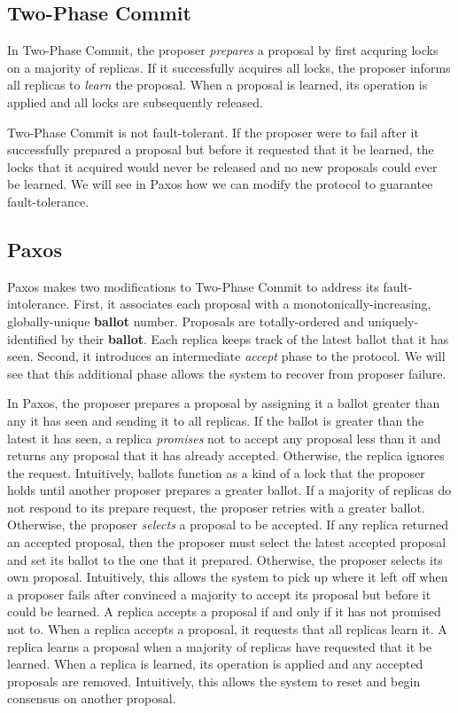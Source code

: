 \documentclass[../main.tex]{subfiles}
\begin{document}
  \subsection{Two-Phase Commit}
  In Two-Phase Commit, the proposer \emph{prepares} a proposal by first acquring locks on a majority
  of replicas. If it successfully acquires all locks, the proposer informs all replicas to
  \emph{learn} the proposal. When a proposal is learned, its operation is applied and all locks are
  subsequently released.

  Two-Phase Commit is not fault-tolerant. If the proposer were to fail after it successfully
  prepared a proposal but before it requested that it be learned, the locks that it acquired would
  never be released and no new proposals could ever be learned. We will see in Paxos how we can
  modify the protocol to guarantee fault-tolerance.

  \subsection{Paxos}
  Paxos makes two modifications to Two-Phase Commit to address its fault-intolerance. First, it
  associates each proposal with a monotonically-increasing, globally-unique \textbf{ballot} number.
  Proposals are totally-ordered and uniquely-identified by their \textbf{ballot}. Each replica
  keeps track of the latest ballot that it has seen. Second, it introduces an intermediate
  \emph{accept} phase to the protocol. We will see that this additional phase allows the system to
  recover from proposer failure. \cite{paxos}

  In Paxos, the proposer prepares a proposal by assigning it a ballot greater than any it has seen
  and sending it to all replicas. If the ballot is greater than the latest it has seen, a replica
  \emph{promises} not to accept any proposal less than it and returns any proposal that it has
  already accepted. Otherwise, the replica ignores the request. Intuitively, ballots function as a
  kind of a lock that the proposer holds until another proposer prepares a greater ballot. If a
  majority of replicas do not respond to its prepare request, the proposer retries with a greater
  ballot. Otherwise, the proposer \emph{selects} a proposal to be accepted. If any replica returned
  an accepted proposal, then the proposer must select the latest accepted proposal and set its
  ballot to the one that it prepared. Otherwise, the proposer selects its own proposal. Intuitively,
  this allows the system to pick up where it left off when a proposer fails after convinced a
  majority to accept its proposal but before it could be learned. A replica accepts a proposal if
  and only if it has not promised not to. When a replica accepts a proposal, it requests that all
  replicas learn it. A replica learns a proposal when a majority of replicas have requested that it
  be learned. When a replica is learned, its operation is applied and any accepted proposals are
  removed. Intuitively, this allows the system to reset and begin consensus on another proposal.
\end{document}
